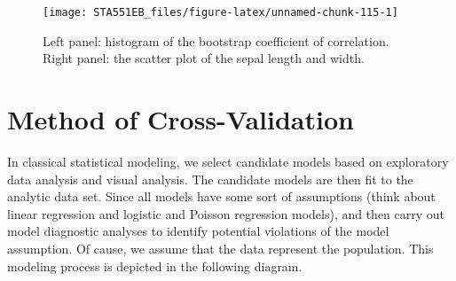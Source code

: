 \documentclass[
]{book}
\newenvironment{Shaded}{\begin{snugshade}}{\end{snugshade}}
\newcommand{\AttributeTok}[1]{\textcolor[rgb]{0.13,0.29,0.53}{#1}}
\newcommand{\CommentTok}[1]{\textcolor[rgb]{0.56,0.35,0.01}{\textit{#1}}}
\newcommand{\DecValTok}[1]{\textcolor[rgb]{0.00,0.00,0.81}{#1}}
\newcommand{\DocumentationTok}[1]{\textcolor[rgb]{0.56,0.35,0.01}{\textbf{\textit{#1}}}}
\newcommand{\FunctionTok}[1]{\textcolor[rgb]{0.13,0.29,0.53}{\textbf{#1}}}
\newcommand{\NormalTok}[1]{#1}
\newcommand{\SpecialCharTok}[1]{\textcolor[rgb]{0.81,0.36,0.00}{\textbf{#1}}}
\newcommand{\StringTok}[1]{\textcolor[rgb]{0.31,0.60,0.02}{#1}}
\begin{document}
\begin{Shaded}
\end{Shaded}

\begin{figure}

{\centering \texttt{[image: STA551EB\_files/figure-latex/unnamed-chunk-115-1]} 

}

\caption{Left panel: histogram of the bootstrap coefficient of correlation. Right panel: the scatter plot of the sepal length and width.}\label{fig:unnamed-chunk-115}
\end{figure}

\hfill\break

\hypertarget{method-of-cross-validation}{%
\chapter{Method of Cross-Validation}\label{method-of-cross-validation}}

In classical statistical modeling, we select candidate models based on exploratory data analysis and visual analysis. The candidate models are then fit to the analytic data set. Since all models have some sort of assumptions (think about linear regression and logistic and Poisson regression models), and then carry out model diagnostic analyses to identify potential violations of the model assumption. Of cause, we assume that the data represent the population. This modeling process is depicted in the following diagram.
\end{document}
